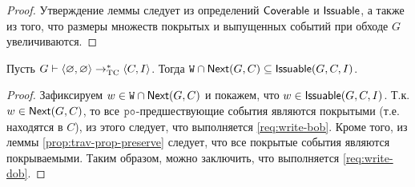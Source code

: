 \begin{proof}
  Утверждение леммы следует из определений ${\sf Coverable}$ и ${\sf Issuable}$, а также из того, что размеры множеств покрытых и выпущенных событий при обходе $G$ увеличиваются.
\end{proof}
\begin{lemma}
  \label{prop:next-write}
  Пусть $G \vdash {\langle{\varnothing, \varnothing}\rangle} \rightarrow_{\rm TC}^{*} {\langle{C, I}\rangle}$.
  Тогда ${\mathtt{W}} \cap {\sf Next}(G, C) \subseteq {\sf Issuable}(G,C,I)$.
\end{lemma}
\begin{proof}
  Зафиксируем $w \in {\mathtt{W}} \cap {\sf Next}(G, C)$ и покажем, что $w \in {\sf Issuable}(G, C, I)$.
  Т.к. $w \in {\sf Next}(G, C)$, то все $\lPO$-предшествующие события являются покрытыми (т.е.
  находятся в $C$), из этого следует, что выполняется \ref{req:write-bob}. Кроме того, из леммы
  \ref{prop:trav-prop-preserve} следует, что все покрытые события являются покрываемыми. Таким образом, можно заключить, что выполняется 
  \ref{req:write-dob}.
\end{proof}

